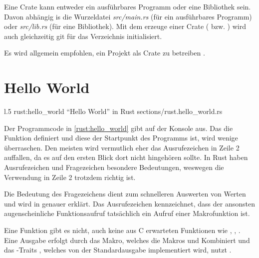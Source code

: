Eine Crate kann entweder ein ausführbares Programm oder eine Bibliothek sein.
Davon abhängig is die Wurzeldatei \textit{src/main.rs} (für ein ausführbares Programm) oder \textit{src/lib.rs} (für eine Bibliothek).
Mit dem erzeuge einer Crate ( bzw. ) wird auch gleichzeitig \gls{git} für das Verzeichnis initialisiert.

Es wird allgemein empfohlen, ein Projekt als Crate zu betreiben .





\section{Hello World}


\begin{wrapfigure}{l}{.5\textwidth}
	\rustcinclude
		{rust:hello_world}
		{\enquote{Hello World} in Rust}
		{sections/rust.hello_world.rs}
\end{wrapfigure}

Der Programmcode in \autoref{rust:hello_world} gibt auf der Konsole  aus.
Das  die Funktion  definiert und diese der Startpunkt des Programms ist, wird wenige überraschen.
Den meisten wird vermutlich eher das Ausrufezeichen in Zeile 2 auffallen, da es auf den ersten Blick dort nicht hingehören sollte.
In Rust haben Ausrufezeichen und Fragezeichen besondere Bedeutungen, weswegen die Verwendung in Zeile 2 trotzdem richtig ist.

Die Bedeutung des Fragezeichens dient zum schnelleren Auswerten von  Werten und wird in  genauer erklärt.
Das Ausrufezeichen kennzeichnet, dass der ansonsten augenscheinliche Funktionsaufruf tatsächlich ein Aufruf einer Makrofunktion ist.

Eine Funktion  gibt es nicht, auch keine aus C erwarteten Funktionen wie , , .
Eine Ausgabe erfolgt durch das  Makro, welches die Makros   und  Kombiniert und das -Traits , welches von der Standardausgabe implementiert wird, nutzt .

